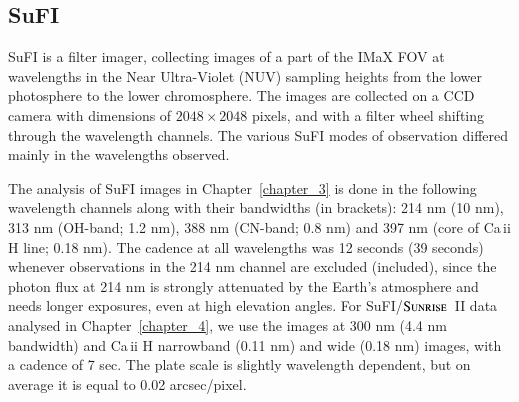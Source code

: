 \documentclass[goettingen, gauss, print]{thesis}
\begin{document}
\subsection{SuFI}
\label{intro-sufi}
SuFI is a filter imager, collecting images of a part of the IMaX FOV at wavelengths in the Near Ultra-Violet (NUV) sampling heights from the lower photosphere to the lower chromosphere. The images are collected on a CCD camera with dimensions of $2048\times2048$ pixels, and with a filter wheel shifting through the wavelength channels. 
The various SuFI modes of observation differed mainly in the wavelengths observed.%

The analysis of SuFI images in Chapter~\ref{chapter_3} is done in the following wavelength channels along with their bandwidths (in brackets): 214 nm (10 nm), 313 nm (OH-band; 1.2 nm), 388 nm (CN-band; 0.8 nm) and 397 nm (core of Ca\,{\sc ii} H line; 0.18 nm). The cadence at all wavelengths was 12 seconds (39 seconds) whenever observations in the 214 nm channel are excluded (included), since the photon flux at 214 nm is strongly attenuated by the Earth's atmosphere and needs longer exposures, even at high elevation angles. For SuFI/$\textsc{Sunrise}$~II data analysed in Chapter~\ref{chapter_4}, we use the images at 300 nm (4.4 nm bandwidth) and Ca\,{\sc ii} H narrowband (0.11 nm) and wide (0.18 nm) images, with a cadence of 7 sec. The plate scale is slightly wavelength dependent, but on average it is equal to 0.02 arcsec/pixel. 



\end{document}

